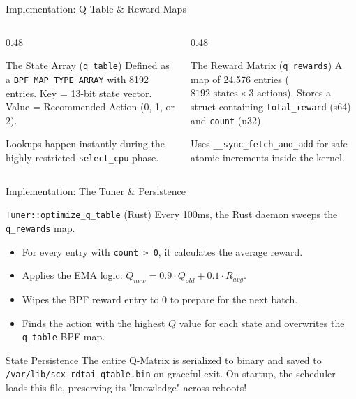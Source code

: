 \documentclass[aspectratio=169]{beamer}
\begin{document}
\begin{frame}{Implementation: Q-Table \& Reward Maps}
    \begin{columns}[T]
        \begin{column}{0.48\textwidth}
            \begin{exampleblock}{The State Array (\texttt{q\_table})}
                \small
                Defined as a \texttt{BPF\_MAP\_TYPE\_ARRAY} with 8192 entries.
                Key = 13-bit state vector.
                Value = Recommended Action (0, 1, or 2).
                
                \vspace{2pt}
                Lookups happen instantly during the highly restricted \texttt{select\_cpu} phase.
            \end{exampleblock}
        \end{column}

        \begin{column}{0.48\textwidth}
            \begin{alertblock}{The Reward Matrix (\texttt{q\_rewards})}
                \small 
                A map of 24,576 entries ($8192 \text{ states} \times 3 \text{ actions}$).
                Stores a struct containing \texttt{total\_reward} (s64) and \texttt{count} (u32).
                
                \vspace{2pt}
                Uses \texttt{\_\_sync\_fetch\_and\_add} for safe atomic increments inside the kernel.
            \end{alertblock}
        \end{column}
    \end{columns}
\end{frame}

\begin{frame}{Implementation: The Tuner \& Persistence}
    \begin{block}{\texttt{Tuner::optimize\_q\_table} (Rust)}
        \small
        Every 100ms, the Rust daemon sweeps the \texttt{q\_rewards} map. 
        \begin{itemize}
            \item For every entry with \texttt{count > 0}, it calculates the average reward.
            \item Applies the EMA logic: $Q_{new} = 0.9 \cdot Q_{old} + 0.1 \cdot R_{avg}$.
            \item Wipes the BPF reward entry to 0 to prepare for the next batch.
            \item Finds the action with the highest $Q$ value for each state and overwrites the \texttt{q\_table} BPF map.
        \end{itemize}
    \end{block}
    
    \begin{exampleblock}{State Persistence}
        \small
        The entire Q-Matrix is serialized to binary and saved to \texttt{/var/lib/scx\_rdtai\_qtable.bin} on graceful exit. On startup, the scheduler loads this file, preserving its "knowledge" across reboots!
    \end{exampleblock}
\end{frame}
\end{document}

